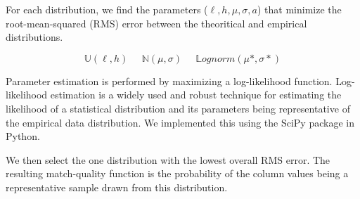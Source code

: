 For each distribution, we find the parameters ($\ell,h,\mu,\sigma,a$) that minimize the root-mean-squared (RMS) error between the theoritical and empirical distributions. 

$$\mathbb U(\ell, h)\;\;\;\;\;\mathbb N(\mu, \sigma)\;\;\;\;\;\mathbb Lognorm(\mu{*},\sigma{*})$$

Parameter estimation is performed by maximizing a log-likelihood function. Log-likelihood estimation is a widely used and robust technique for estimating the likelihood of a statistical distribution and its parameters being representative of the empirical data distribution. We implemented this using the SciPy package in Python. 

We then select the one distribution with the lowest overall RMS error. The resulting match-quality function is the probability of the column values being a representative sample drawn from this distribution.

